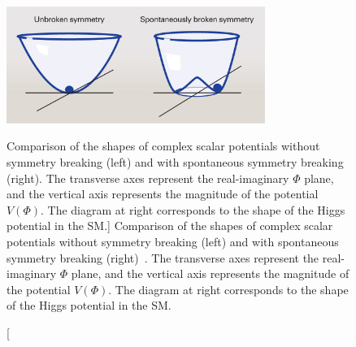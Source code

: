 \begin{figure}
	\begin{center}
	\includegraphics[width=0.75\textwidth]{fig/theory/spont_sym_breaking.jpg}
		\caption
		[Comparison of the shapes of complex scalar potentials without symmetry breaking (left) and with spontaneous symmetry breaking (right). 
		The transverse axes represent the real-imaginary $\Phi$ plane, 
		and the vertical axis represents the magnitude of the potential $V(\Phi)$. The diagram at right corresponds to the shape of the Higgs potential in the SM.]
		{Comparison of the shapes of complex scalar potentials without symmetry breaking (left) and with spontaneous symmetry breaking (right)~\cite{VHiggsImage}. 
		The transverse axes represent the real-imaginary $\Phi$ plane, 
		and the vertical axis represents the magnitude of the potential $V(\Phi)$. The diagram at right corresponds to the shape of the Higgs potential in the SM.}
		\label{fig:VHiggs}
	\end{center}
\end{figure}

